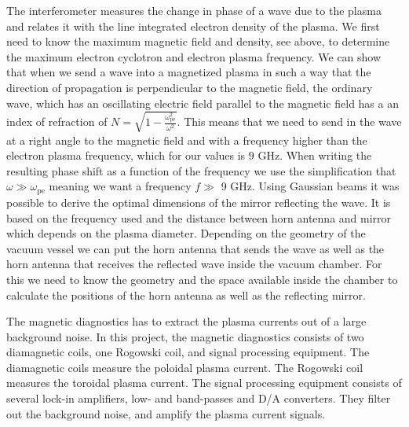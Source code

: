 The interferometer measures the change in phase of a wave due to the plasma and relates it with the line integrated electron density of the plasma. We first need to know the maximum magnetic field and density, see above, to determine the maximum electron cyclotron and electron plasma frequency. We can show that when we send a wave into a magnetized plasma in such a way that the direction of propagation is perpendicular to the magnetic field, the ordinary wave, which has an oscillating electric field parallel to the magnetic field has a an index of refraction of $N = \sqrt{1 - \frac{\omega_\mathrm{pe}^2}{\omega^2 }}$. This means that we need to send in the wave at a right angle to the magnetic field and with a frequency higher than the electron plasma frequency, which for our values is $9$ GHz. When writing the resulting phase shift as a function of the frequency we use the simplification that $\omega \gg \omega_\mathrm{pe}$ meaning we want a frequency $f \gg$ 9 GHz. Using Gaussian beams it was possible to derive the optimal dimensions of the mirror reflecting the wave. It is based on the frequency used and the distance between horn antenna and mirror which depends on the plasma diameter. Depending on the geometry of the vacuum vessel we can put the horn antenna that sends the wave as well as the horn antenna that receives the reflected wave inside the vacuum chamber. For this we need to know the geometry and the space available inside the chamber to calculate the positions of the horn antenna as well as the reflecting mirror.

The magnetic diagnostics has to extract the plasma currents out of a large background noise. In this project, the magnetic diagnostics consists of two diamagnetic coils, one Rogowski coil, and signal
processing equipment. The diamagnetic coils measure the poloidal plasma current. The Rogowski
coil measures the toroidal plasma current. The signal processing
equipment consists of several lock-in amplifiers, low- and band-passes and D/A converters. They filter out the background
noise, and amplify the plasma current signals.


